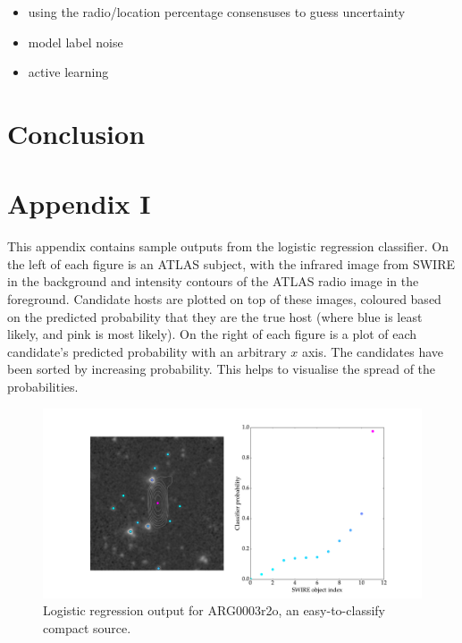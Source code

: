 \documentclass[a4paper]{article}
\begin{document}
    \begin{itemize}
      \item using the radio/location percentage consensuses to guess uncertainty
      \item model label noise
      \item active learning
    \end{itemize}

  \section{Conclusion}

  
  

  \newpage
  \section*{Appendix I}

    This appendix contains sample outputs from the logistic regression classifier. On the left of each figure is an ATLAS subject, with the infrared image from SWIRE in the background and intensity contours of the ATLAS radio image in the foreground. Candidate hosts are plotted on top of these images, coloured based on the predicted probability that they are the true host (where blue is least likely, and pink is most likely). On the right of each figure is a plot of each candidate's predicted probability with an arbitrary $x$ axis. The candidates have been sorted by increasing probability. This helps to visualise the spread of the probabilities.

    \begin{figure}[!ht]
      \centering
      \includegraphics[width=\linewidth]{images/ARG0003r2o_lr.pdf}
      \caption{Logistic regression output for ARG0003r2o, an easy-to-classify compact source.}
      \label{fig:ARG0003r2o_lr}
    \end{figure}
\end{document}
